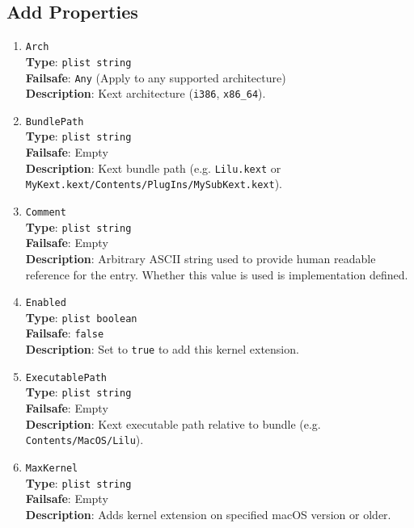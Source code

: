 \documentclass[]{article}
\begin{document}
\subsection{Add Properties}\label{kernelpropsadd}

\begin{enumerate}

\item
  \texttt{Arch}\\
  \textbf{Type}: \texttt{plist\ string}\\
  \textbf{Failsafe}: \texttt{Any} (Apply to any supported architecture)\\
  \textbf{Description}: Kext architecture (\texttt{i386}, \texttt{x86\_64}).

\item
  \texttt{BundlePath}\\
  \textbf{Type}: \texttt{plist\ string}\\
  \textbf{Failsafe}: Empty\\
  \textbf{Description}: Kext bundle path (e.g. \texttt{Lilu.kext}
  or \texttt{MyKext.kext/Contents/PlugIns/MySubKext.kext}).

\item
  \texttt{Comment}\\
  \textbf{Type}: \texttt{plist\ string}\\
  \textbf{Failsafe}: Empty\\
  \textbf{Description}: Arbitrary ASCII string used to provide human readable
  reference for the entry. Whether this value is used is implementation defined.

\item
  \texttt{Enabled}\\
  \textbf{Type}: \texttt{plist\ boolean}\\
  \textbf{Failsafe}: \texttt{false}\\
  \textbf{Description}: Set to \texttt{true} to add this kernel extension.

\item
  \texttt{ExecutablePath}\\
  \textbf{Type}: \texttt{plist\ string}\\
  \textbf{Failsafe}: Empty\\
  \textbf{Description}: Kext executable path relative to bundle
  (e.g. \texttt{Contents/MacOS/Lilu}).

\item
  \texttt{MaxKernel}\\
  \textbf{Type}: \texttt{plist\ string}\\
  \textbf{Failsafe}: Empty\\
  \textbf{Description}: Adds kernel extension on specified macOS version or older.


\end{enumerate}
\end{document}
